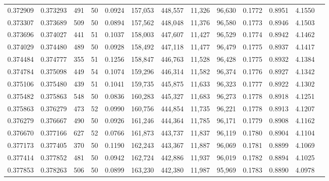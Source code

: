 \begin{tabular}{rrrrrrrrrrrrr}
0.372909 & 0.373293 &   491 &  50 &                                     0.0924 & 157,053 & 448,557 &  11,326 &  96,630 & 0.1772 & 0.8951 & 4.1550 \\
0.373307 & 0.373689 &   509 &  50 &                                     0.0894 & 157,562 & 448,048 &  11,376 &  96,580 & 0.1773 & 0.8946 & 4.1503 \\
0.373696 & 0.374027 &   441 &  51 &                                     0.1037 & 158,003 & 447,607 &  11,427 &  96,529 & 0.1774 & 0.8942 & 4.1462 \\
0.374029 & 0.374480 &   489 &  50 &                                     0.0928 & 158,492 & 447,118 &  11,477 &  96,479 & 0.1775 & 0.8937 & 4.1417 \\
0.374484 & 0.374777 &   355 &  51 &                                     0.1256 & 158,847 & 446,763 &  11,528 &  96,428 & 0.1775 & 0.8932 & 4.1384 \\
0.374784 & 0.375098 &   449 &  54 &                                     0.1074 & 159,296 & 446,314 &  11,582 &  96,374 & 0.1776 & 0.8927 & 4.1342 \\
0.375106 & 0.375480 &   439 &  51 &                                     0.1041 & 159,735 & 445,875 &  11,633 &  96,323 & 0.1777 & 0.8922 & 4.1302 \\
0.375482 & 0.375863 &   548 &  50 &                                     0.0836 & 160,283 & 445,327 &  11,683 &  96,273 & 0.1778 & 0.8918 & 4.1251 \\
0.375863 & 0.376279 &   473 &  52 &                                     0.0990 & 160,756 & 444,854 &  11,735 &  96,221 & 0.1778 & 0.8913 & 4.1207 \\
0.376279 & 0.376667 &   490 &  50 &                                     0.0926 & 161,246 & 444,364 &  11,785 &  96,171 & 0.1779 & 0.8908 & 4.1162 \\
0.376670 & 0.377166 &   627 &  52 &                                     0.0766 & 161,873 & 443,737 &  11,837 &  96,119 & 0.1780 & 0.8904 & 4.1104 \\
0.377173 & 0.377405 &   370 &  50 &                                     0.1190 & 162,243 & 443,367 &  11,887 &  96,069 & 0.1781 & 0.8899 & 4.1069 \\
0.377414 & 0.377852 &   481 &  50 &                                     0.0942 & 162,724 & 442,886 &  11,937 &  96,019 & 0.1782 & 0.8894 & 4.1025 \\
0.377853 & 0.378263 &   506 &  50 &                                     0.0899 & 163,230 & 442,380 &  11,987 &  95,969 & 0.1783 & 0.8890 & 4.0978 \\

\end{tabular}
